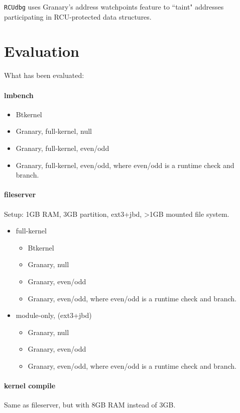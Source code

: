 \documentclass[preprint]{sigplanconf}
\begin{document}
\texttt{RCUdbg} uses Granary's address watchpoints feature \cite{BehaveOrBeWatched} to ``taint" addresses participating in RCU-protected data structures.

\section{Evaluation}\label{sec:eval}

What has been evaluated:

\paragraph{lmbench}
\begin{itemize}
	\item Btkernel
	\item Granary, full-kernel, null
	\item Granary, full-kernel, even/odd
	\item Granary, full-kernel, even/odd, where even/odd is a runtime check and branch.
\end{itemize}

\paragraph{fileserver}
Setup: 1GB RAM, 3GB partition, ext3+jbd, >1GB mounted file system.
\begin{itemize}
	\item full-kernel
	\begin{itemize}
		\item Btkernel
		\item Granary, null
		\item Granary, even/odd
		\item Granary, even/odd, where even/odd is a runtime check and branch.
	\end{itemize}
	\item module-only, (ext3+jbd)
	\begin{itemize}
		\item Granary, null
		\item Granary, even/odd
		\item Granary, even/odd, where even/odd is a runtime check and branch.
	\end{itemize}
\end{itemize}

\paragraph{kernel compile}
Same as fileserver, but with 8GB RAM instead of 3GB.
\end{document}

